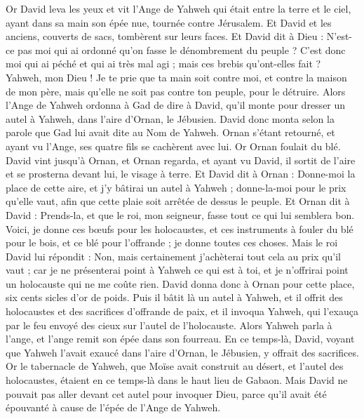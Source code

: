 \begin{multicols}{2}
Or David leva les yeux et vit l'Ange de Yahweh qui était entre la terre et le ciel, ayant dans sa main son épée nue, tournée contre Jérusalem. Et David et les anciens, couverts de sacs, tombèrent sur leurs faces.
Et David dit à Dieu : N'est-ce pas moi qui ai ordonné qu'on fasse le dénombrement du peuple ? C'est donc moi qui ai péché et qui ai très mal agi ; mais ces brebis qu'ont-elles fait ? Yahweh, mon Dieu ! Je te prie que ta main soit contre moi, et contre la maison de mon père, mais qu'elle ne soit pas contre ton peuple, pour le détruire.
Alors l'Ange de Yahweh ordonna à Gad de dire à David, qu'il monte pour dresser un autel à Yahweh, dans l'aire d'Ornan, le Jébusien.
David donc monta selon la parole que Gad lui avait dite au Nom de Yahweh.
Ornan s'étant retourné, et ayant vu l'Ange, ses quatre fils se cachèrent avec lui. Or Ornan foulait du blé.
David vint jusqu'à Ornan, et Ornan regarda, et ayant vu David, il sortit de l'aire et se prosterna devant lui, le visage à terre.
Et David dit à Ornan : Donne-moi la place de cette aire, et j'y bâtirai un autel à Yahweh ; donne-la-moi pour le prix qu'elle vaut, afin que cette plaie soit arrêtée de dessus le peuple.
Et Ornan dit à David : Prends-la, et que le roi, mon seigneur, fasse tout ce qui lui semblera bon. Voici, je donne ces bœufs pour les holocaustes, et ces instruments à fouler du blé pour le bois, et ce blé pour l'offrande ; je donne toutes ces choses.
Mais le roi David lui répondit : Non, mais certainement j'achèterai tout cela au prix qu'il vaut ; car je ne présenterai point à Yahweh ce qui est à toi, et je n'offrirai point un holocauste qui ne me coûte rien.
David donna donc à Ornan pour cette place, six cents sicles d'or de poids.
Puis il bâtit là un autel à Yahweh, et il offrit des holocaustes et des sacrifices d'offrande de paix, et il invoqua Yahweh, qui l'exauça par le feu envoyé des cieux sur l'autel de l'holocauste.
Alors Yahweh parla à l'ange, et l'ange remit son épée dans son fourreau.
En ce temps-là, David, voyant que Yahweh l'avait exaucé dans l'aire d'Ornan, le Jébusien, y offrait des sacrifices.
Or le tabernacle de Yahweh, que Moïse avait construit au désert, et l'autel des holocaustes, étaient en ce temps-là dans le haut lieu de Gabaon.
Mais David ne pouvait pas aller devant cet autel pour invoquer Dieu, parce qu'il avait été épouvanté à cause de l'épée de l'Ange de Yahweh.

\end{multicols}
